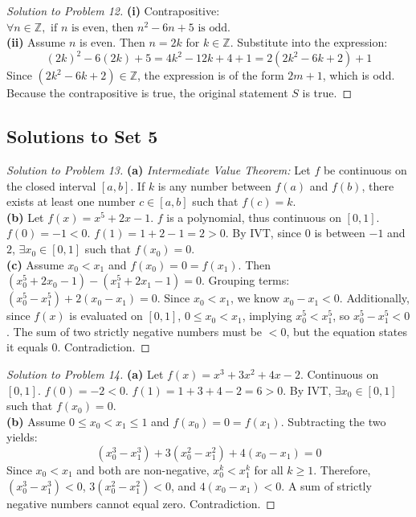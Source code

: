 \documentclass{article}
\begin{document}
\begin{proof}[Solution to Problem 12]
\textbf{(i)} Contrapositive: $\forall n \in \mathbb{Z}, \text{ if } n \text{ is even, then } n^2 - 6n + 5 \text{ is odd}$. \\
\textbf{(ii)} Assume $n$ is even. Then $n = 2k$ for $k \in \mathbb{Z}$. Substitute into the expression:
\[ (2k)^2 - 6(2k) + 5 = 4k^2 - 12k + 4 + 1 = 2(2k^2 - 6k + 2) + 1 \]
Since $(2k^2 - 6k + 2) \in \mathbb{Z}$, the expression is of the form $2m+1$, which is odd. Because the contrapositive is true, the original statement $S$ is true.
\end{proof}

\subsection{Solutions to Set 5}
\begin{proof}[Solution to Problem 13]
\textbf{(a)} \textit{Intermediate Value Theorem:} Let $f$ be continuous on the closed interval $[a,b]$. If $k$ is any number between $f(a)$ and $f(b)$, there exists at least one number $c \in [a,b]$ such that $f(c) = k$. \\
\textbf{(b)} Let $f(x) = x^5+2x-1$. $f$ is a polynomial, thus continuous on $[0,1]$. $f(0) = -1 < 0$. $f(1) = 1+2-1 = 2 > 0$. By IVT, since $0$ is between $-1$ and $2$, $\exists x_0 \in [0,1]$ such that $f(x_0)=0$. \\
\textbf{(c)} Assume $x_0 < x_1$ and $f(x_0) = 0 = f(x_1)$. Then $(x_0^5+2x_0-1) - (x_1^5+2x_1-1) = 0$. Grouping terms: $(x_0^5 - x_1^5) + 2(x_0 - x_1) = 0$. Since $x_0 < x_1$, we know $x_0 - x_1 < 0$. Additionally, since $f(x)$ is evaluated on $[0,1]$, $0 \le x_0 < x_1$, implying $x_0^5 < x_1^5$, so $x_0^5 - x_1^5 < 0$. The sum of two strictly negative numbers must be $<0$, but the equation states it equals $0$. Contradiction.
\end{proof}

\begin{proof}[Solution to Problem 14]
\textbf{(a)} Let $f(x) = x^3+3x^2+4x-2$. Continuous on $[0,1]$. $f(0) = -2 < 0$. $f(1) = 1+3+4-2 = 6 > 0$. By IVT, $\exists x_0 \in [0,1]$ such that $f(x_0)=0$. \\
\textbf{(b)} Assume $0 \le x_0 < x_1 \le 1$ and $f(x_0) = 0 = f(x_1)$. Subtracting the two yields:
\[ (x_0^3 - x_1^3) + 3(x_0^2 - x_1^2) + 4(x_0 - x_1) = 0 \]
Since $x_0 < x_1$ and both are non-negative, $x_0^k < x_1^k$ for all $k \ge 1$. Therefore, $(x_0^3 - x_1^3) < 0$, $3(x_0^2 - x_1^2) < 0$, and $4(x_0 - x_1) < 0$. A sum of strictly negative numbers cannot equal zero. Contradiction.
\end{proof}
\end{document}
